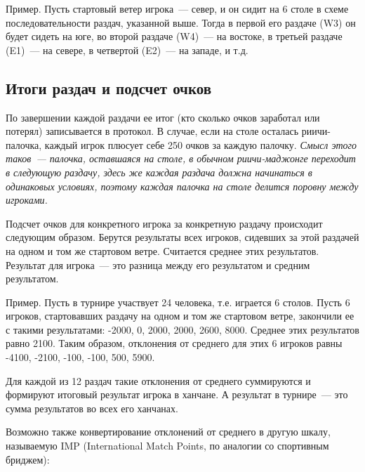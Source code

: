 \begin{additional}
\vspace{0.3cm}

Пример. Пусть стартовый ветер игрока~--- север, и он сидит на 6 столе в схеме последовательности раздач, указанной выше. Тогда в первой его раздаче (W3) он будет сидеть на юге, во второй раздаче (W4)~--- на востоке, в третьей раздаче (E1)~--- на севере, в четвертой (E2)~--- на западе, и т.д.

\subsection{Итоги раздач и подсчет очков}

По завершении каждой раздачи ее итог (кто сколько очков заработал или потерял) записывается в протокол. В случае, если на столе осталась риичи-палочка, каждый игрок плюсует себе 250 очков за каждую палочку. \textit{Смысл этого таков~--- палочка, оставшаяся на столе, в обычном риичи-маджонге переходит в следующую раздачу, здесь же каждая раздача должна начинаться в одинаковых условиях, поэтому каждая палочка на столе делится поровну между игроками.}

\vspace{0.3cm}

Подсчет очков для конкретного игрока за конкретную раздачу происходит следующим образом. Берутся результаты всех игроков, сидевших за этой раздачей на одном и том же стартовом ветре. Считается среднее этих результатов. Результат для игрока~--- это разница между его результатом и средним результатом.

\vspace{0.3cm}

Пример. Пусть в турнире участвует 24 человека, т.е. играется 6 столов. Пусть 6 игроков, стартовавших раздачу на одном и том же стартовом ветре, закончили ее с такими результатами: -2000, 0, 2000, 2000, 2600, 8000. Среднее этих результатов равно 2100. Таким образом, отклонения от среднего для этих 6 игроков равны -4100, -2100, -100, -100, 500, 5900.

\vspace{0.3cm}

Для каждой из 12 раздач такие отклонения от среднего суммируются и формируют итоговый результат игрока в ханчане. А результат в турнире~--- это сумма результатов во всех его ханчанах.

\vspace{0.3cm}

Возможно также конвертирование отклонений от среднего в другую шкалу, называемую IMP (International Match Points, по аналогии со спортивным бриджем):


\end{additional}
